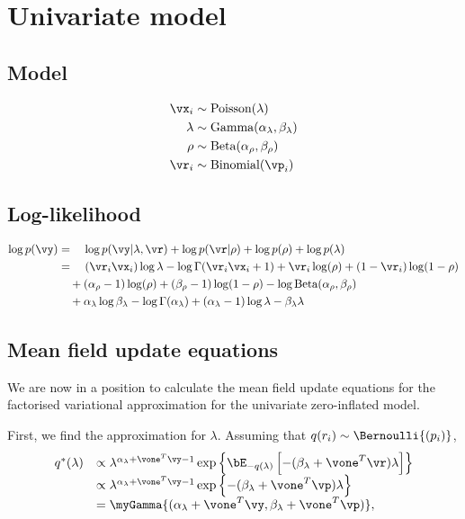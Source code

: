 \section{Univariate model} 

\subsection{Model}
\begin{align*}
	\vx_i   & \sim \text{Poisson}(\lambda)                    \\
	\lambda & \sim \text{Gamma}(\alpha_\lambda,\beta_\lambda) \\
	\rho    & \sim \text{Beta}(\alpha_\rho, \beta_\rho)       \\
	\vr_i   & \sim \text{Binomial}(\vp_i)                     
\end{align*}

\subsection{Log-likelihood}
\begin{align*}
\log p(\vy) &= \quad \log p(\vy | \lambda, \vr) + \log p(\vr | \rho) + \log p(\rho) + \log p(\lambda) \\
&= \quad (\vr_i \vx_i) \log \lambda - \log \Gamma(\vr_i \vx_i + 1) + \vr_i \log(\rho) + (1 - \vr_i) \log(1 - \rho) \\
& \quad + (\alpha_\rho - 1) \log (\rho) + (\beta_\rho - 1) \log(1 - \rho) - \log \text{Beta} (\alpha_\rho, \beta_\rho) \\
& \quad + \alpha_\lambda \log \beta_\lambda - \log \Gamma(\alpha_\lambda) + (\alpha_\lambda - 1) \log \lambda - \beta_\lambda \lambda
\end{align*}

\subsection{Mean field update equations}
We are now in a position to calculate the mean field update equations for the factorised
variational approximation for the univariate zero-inflated model.

First, we find the approximation for $\lambda$. Assuming that $q(r_i) \sim \Bernoulli{(p_i)}$,
\[
\begin{array}{rl}
	q^*(\lambda)
	  & \propto                                                            
	\lambda^{\alpha_\lambda+\vone^T\vy - 1} 
	\exp\left\{ 
	\bE_{-q(\lambda)} \left[
	-(\beta_\lambda + \vone^T\vr) \lambda 
	\right] 
	\right\} 
	\\ [0.5ex]
	  &                                                                    
	\propto \lambda^{\alpha_\lambda+\vone^T\vy - 1} \exp{\left \{-(\beta_\lambda + \vone^T\vp)\lambda \right \} } 
	\\
	  & = \myGamma{(\alpha_\lambda+\vone^T\vy, \beta_\lambda+\vone^T\vp)}, 
\end{array}
\]

